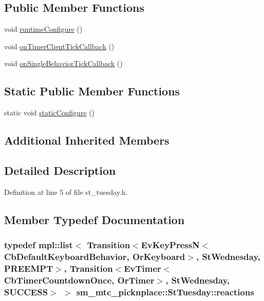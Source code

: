\subsection*{Public Member Functions}
\begin{DoxyCompactItemize}
\item 
void \hyperlink{structsm__mtc__picknplace_1_1StTuesday_a07e9bba9e0ffc9dfbf302d790cd93eee}{runtime\+Configure} ()
\item 
void \hyperlink{structsm__mtc__picknplace_1_1StTuesday_a91fd2e536e4a26a621c29fcf5ae8bbe9}{on\+Timer\+Client\+Tick\+Callback} ()
\item 
void \hyperlink{structsm__mtc__picknplace_1_1StTuesday_acc5e997da02a01eb7453175e4e762c97}{on\+Single\+Behavior\+Tick\+Callback} ()
\end{DoxyCompactItemize}
\subsection*{Static Public Member Functions}
\begin{DoxyCompactItemize}
\item 
static void \hyperlink{structsm__mtc__picknplace_1_1StTuesday_ad03a137b5ddd6b55ee8c25c60190c3e7}{static\+Configure} ()
\end{DoxyCompactItemize}
\subsection*{Additional Inherited Members}


\subsection{Detailed Description}


Definition at line 5 of file st\+\_\+tuesday.\+h.



\subsection{Member Typedef Documentation}
\subsubsection[{\texorpdfstring{reactions}{reactions}}]{\setlength{\rightskip}{0pt plus 5cm}typedef mpl\+::list$<$ Transition$<$Ev\+Key\+PressN$<$Cb\+Default\+Keyboard\+Behavior, {\bf Or\+Keyboard}$>$, {\bf St\+Wednesday}, {\bf P\+R\+E\+E\+M\+PT}$>$, Transition$<$Ev\+Timer$<$Cb\+Timer\+Countdown\+Once, {\bf Or\+Timer}$>$, {\bf St\+Wednesday}, {\bf S\+U\+C\+C\+E\+SS}$>$ $>$ {\bf sm\+\_\+mtc\+\_\+picknplace\+::\+St\+Tuesday\+::reactions}}\hypertarget{structsm__mtc__picknplace_1_1StTuesday_afd77700918b8d9453b4def53eedee1df}{}\label{structsm__mtc__picknplace_1_1StTuesday_afd77700918b8d9453b4def53eedee1df}


